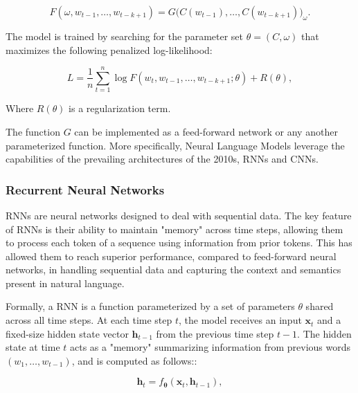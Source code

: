 \begin{equation}
    F(\omega, w_{t-1}, \ldots, w_{t-k+1}) = G\bigl(C(w_{t-1}), \ldots, C(w_{t-k+1})\bigr)_{\omega}.
\label{equation:nlm-bengio}
\end{equation}

The model is trained by searching for the parameter set $\theta = (C, \omega)$ that maximizes the following penalized log-likelihood:

\begin{equation}
    L = \frac{1}{n} \sum_{t=1}^n \log F(w_t, w_{t-1}, \ldots, w_{t-k+1}; \theta) + R(\theta),
\label{equation:nlm-log-likelihood}
\end{equation}

\noindent Where $R(\theta)$ is a regularization term.

The function $G$ can be implemented as a feed-forward network or any another parameterized function. More specifically, Neural Language Models leverage the capabilities of the prevailing architectures of the 2010s, \acp{RNN} and \acp{CNN}.


\subsubsection{Recurrent Neural Networks}

\acp{RNN} are neural networks designed to deal with sequential data. The key feature of \acp{RNN} is their ability to maintain "memory" across time steps, allowing them to process each token of a sequence using information from prior tokens. This has allowed them to reach superior performance, compared to feed-forward neural networks, in handling sequential data and capturing the context and semantics present in natural language.  

\noindent Formally, a \ac{RNN} is a function parameterized by a set of parameters $\theta$ shared across all time steps. At each time step $t$, the model receives an input $\bm{x}_t$ and a fixed-size hidden state vector $\bm{h}_{t-1}$ from the previous time step $t-1$. The hidden state at time $t$ acts as a "memory" summarizing information from previous words $(w_1, \ldots, w_{t-1})$, and is computed as follows::

\begin{equation}
    \bm{h}_{t} = f_{\bm{\theta}}(\bm{x}_t, \bm{h}_{t-1}),  
\end{equation}

